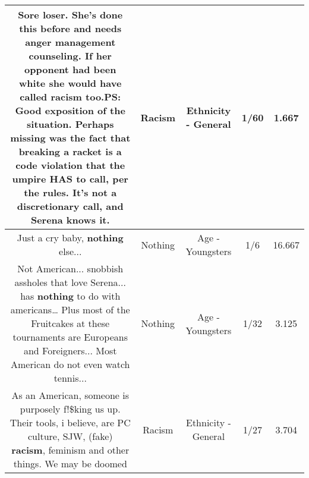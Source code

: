 \documentclass[11pt]{article}
\newlength\mylength
\begin{document}
\begin{center}
\begin{longtable}{|C{.65\mylength}|C{.30\mylength}|C{.12\mylength}|C{.12\mylength}|C{.12\mylength}|}
  \small Sore loser. She's done this before and needs anger management counseling. If her opponent had been white she would have called \textbf{racism} too.PS: Good exposition of the situation. Perhaps missing was the fact that breaking a racket is a code violation that the umpire HAS to call, per the rules. It's not a discretionary call, and Serena knows it.\normalsize   & Racism & Ethnicity - General & 1/60 & 1.667 \\  \hline
  \small Just a cry baby, \textbf{nothing} else...\normalsize   & Nothing & Age - Youngsters & 1/6 & 16.667 \\  \hline
  \small Not American... snobbish assholes that love Serena... has \textbf{nothing} to do with americans… Plus most of the Fruitcakes at these tournaments are Europeans and Foreigners... Most American do not even watch tennis...\normalsize   & Nothing & Age - Youngsters & 1/32 & 3.125 \\  \hline
  \small As an American, someone is purposely f!\$king us up. Their tools, i believe, are PC culture, SJW, (fake) \textbf{racism}, feminism and other things. We may be doomed\normalsize   & Racism & Ethnicity - General & 1/27 & 3.704 \\  \hline

\end{longtable}
\end{center}
\end{document}
